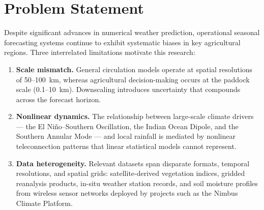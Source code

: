\section{Problem Statement}

Despite significant advances in numerical weather prediction, operational
seasonal forecasting systems continue to exhibit systematic biases in key
agricultural regions. Three interrelated limitations motivate this research:

\begin{enumerate}[label=(\arabic*),leftmargin=*]
  \item \textbf{Scale mismatch.} General circulation models operate at spatial
        resolutions of 50--100~km, whereas agricultural decision-making occurs
        at the paddock scale (0.1--10~km). Downscaling introduces uncertainty
        that compounds across the forecast horizon.
  \item \textbf{Nonlinear dynamics.} The relationship between large-scale
        climate drivers --- the El Ni\~{n}o--Southern Oscillation, the Indian
        Ocean Dipole, and the Southern Annular Mode --- and local rainfall is
        mediated by nonlinear teleconnection patterns that linear statistical
        models cannot represent.
  \item \textbf{Data heterogeneity.} Relevant datasets span disparate formats,
        temporal resolutions, and spatial grids: satellite-derived vegetation
        indices, gridded reanalysis products, in-situ weather station records,
        and soil moisture profiles from wireless sensor networks deployed by
        projects such as the Nimbus Climate Platform.
\end{enumerate}
